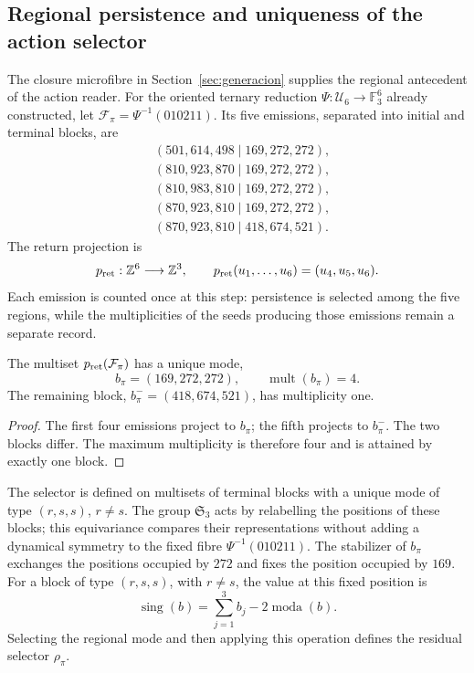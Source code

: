 \subsection{Regional persistence and uniqueness of the action selector}
\label{sec:accion-selector-regional}

The closure microfibre in Section~\ref{sec:generacion} supplies the
regional antecedent of the action reader. For the oriented ternary reduction
\(\Psi:\mathcal U_6\to\mathbb F_3^6\) already constructed, let
\(\mathcal F_\pi=\Psi^{-1}(010211)\). Its five emissions, separated
into initial and terminal blocks, are
\[
\begin{aligned}
 &(501,614,498\mid169,272,272),\\
 &(810,923,870\mid169,272,272),\\
 &(810,983,810\mid169,272,272),\\
 &(870,923,810\mid169,272,272),\\
 &(870,923,810\mid418,674,521).
\end{aligned}
\]
The return projection is
\[
 p_{\rm ret}:\mathbb Z^6\longrightarrow\mathbb Z^3,
 \qquad p_{\rm ret}(u_1,\ldots,u_6)=(u_4,u_5,u_6).
\]
Each emission is counted once at this step: persistence is selected
among the five regions, while the multiplicities of the seeds producing
those emissions remain a separate record.

\begin{proposition}
\label{prop:accion-bloque-persistente}
The multiset \(p_{\rm ret}(\mathcal F_\pi)\) has a unique mode,
\[
 b_\pi=(169,272,272),\qquad \operatorname{mult}(b_\pi)=4.
\]
The remaining block, \(b_\pi^-=(418,674,521)\), has multiplicity one.
\end{proposition}
\begin{proof}
The first four emissions project to \(b_\pi\); the fifth projects
to \(b_\pi^-\). The two blocks differ. The maximum multiplicity
is therefore four and is attained by exactly one block.
\end{proof}

The selector is defined on multisets of terminal blocks with a unique
mode of type \((r,s,s)\), \(r\ne s\). The group \(\mathfrak S_3\)
acts by relabelling the positions of these blocks; this equivariance
compares their representations without adding a dynamical symmetry to
the fixed fibre \(\Psi^{-1}(010211)\). The stabilizer
of \(b_\pi\) exchanges the positions occupied by \(272\) and fixes
the position occupied by \(169\). For a block of type \((r,s,s)\),
with \(r\ne s\), the value at this fixed position is
\[
 \operatorname{sing}(b)=\sum_{j=1}^3 b_j-2\operatorname{moda}(b).
\]
Selecting the regional mode and then applying this operation defines
the residual selector \(\rho_\pi\).

